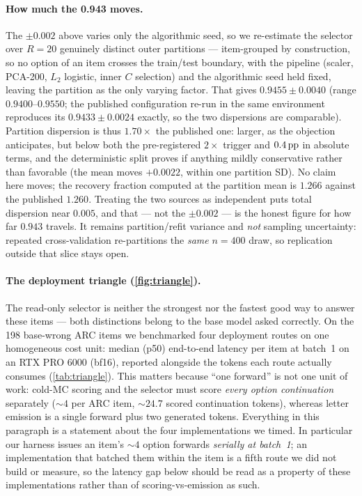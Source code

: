 \paragraph{How much the 0.943 moves.}
The $\pm 0.002$ above varies only the algorithmic seed, so we re-estimate the
selector over $R=20$ genuinely distinct outer partitions --- item-grouped by
construction, so no option of an item crosses the train/test boundary, with the
pipeline (scaler, PCA-200, $L_2$ logistic, inner $C$ selection) and the algorithmic
seed held fixed, leaving the partition as the only varying factor. That gives
$\mathbf{0.9455 \pm 0.0040}$ (range $0.9400$--$0.9550$; the published configuration
re-run in the same environment reproduces its $0.9433 \pm 0.0024$ exactly, so the two
dispersions are comparable). Partition dispersion is thus $\mathbf{1.70\times}$ the
published one: larger, as the objection anticipates, but below both the
pre-registered $2\times$ trigger and $0.4\,\mathrm{pp}$ in absolute terms, and the
deterministic split proves if anything mildly conservative rather than favorable
(the mean moves $+0.0022$, within one partition SD). No claim here moves; the
recovery fraction computed at the partition mean is $1.266$ against the published
$1.260$. Treating the two sources as independent puts total dispersion near
$0.005$, and that --- not the $\pm 0.002$ --- is the honest figure for how far
$0.943$ travels. It remains partition/refit variance and \emph{not} sampling
uncertainty: repeated cross-validation re-partitions the \emph{same} $n{=}400$ draw,
so replication outside that slice stays open.

\paragraph{The deployment triangle (\cref{fig:triangle}).}
The read-only selector is neither the strongest nor the fastest good way to answer
these items --- both distinctions belong to the base model asked correctly. On the
198 base-wrong ARC items we benchmarked four deployment routes on one homogeneous
cost unit: median (p50) end-to-end latency per item at batch~1 on an RTX PRO 6000
(bf16), reported alongside the tokens each route actually consumes
(\cref{tab:triangle}). This matters because ``one forward'' is not one unit of work:
cold-MC scoring and the selector must score \emph{every option continuation}
separately (${\sim}4$ per ARC item, ${\sim}24.7$ scored continuation tokens), whereas
letter emission is a single forward plus two generated tokens. Everything in this
paragraph is a statement about the four implementations we timed. In particular our
harness issues an item's ${\sim}4$ option forwards \emph{serially at batch~1}; an
implementation that batched them within the item is a fifth route we did not build
or measure, so the latency gap below should be read as a property of these
implementations rather than of scoring-vs-emission as such.

